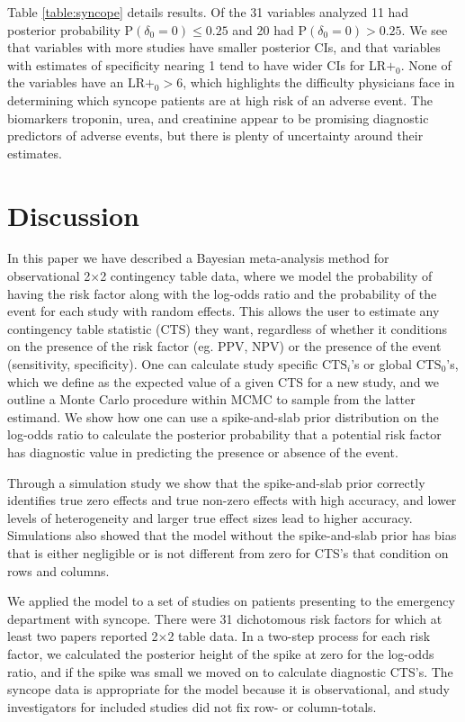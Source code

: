\documentclass[AMA,STIX1COL]{WileyNJD-v2}
\begin{document}
Table \ref{table:syncope} details results. Of the 31 variables analyzed 11 had posterior probability $\mbox{P}(\delta_0 = 0) \le 0.25$ and 20 had $\mbox{P}(\delta_0 = 0) > 0.25$. We see that variables with more studies have smaller posterior CIs, and that variables with estimates of specificity nearing 1 tend to have wider CIs for LR$+_0$. None of the variables have an $\mbox{LR}+_0 > 6$, which highlights the difficulty physicians face in determining which syncope patients are at high risk of an adverse event. The biomarkers troponin, urea, and creatinine appear to be promising diagnostic predictors of adverse events, but there is plenty of uncertainty around their estimates. 

\section{Discussion}

In this paper we have described a Bayesian meta-analysis method for observational 2$\times$2 contingency table data, where we model the probability of having the risk factor along with the log-odds ratio and the probability of the event for each study with random effects. This allows the user to estimate any contingency table statistic (CTS) they want, regardless of whether it conditions on the presence of the risk factor (eg. PPV, NPV) or the presence of the event (sensitivity, specificity). One can calculate study specific $\mbox{CTS}_i$'s or global $\mbox{CTS}_0$'s, which we define as the expected value of a given CTS for a new study, and we outline a Monte Carlo procedure within MCMC to sample from the latter estimand. We show how one can use a spike-and-slab prior distribution on the log-odds ratio to calculate the posterior probability that a potential risk factor has diagnostic value in predicting the presence or absence of the event.

Through a simulation study we show that the spike-and-slab prior correctly identifies true zero effects and true non-zero effects with high accuracy, and lower levels of heterogeneity and larger true effect sizes lead to higher accuracy. Simulations also showed that the model without the spike-and-slab prior has bias that is either negligible or is not different from zero for CTS's that condition on rows and columns. 

We applied the model to a set of studies on patients presenting to the emergency department with syncope. There were 31 dichotomous risk factors for which at least two papers reported 2$\times$2 table data. In a two-step process for each risk factor, we calculated the posterior height of the spike at zero for the log-odds ratio, and if the spike was small we moved on to calculate diagnostic CTS's. The syncope data is appropriate for the model because it is observational, and study investigators for included studies did not fix row- or column-totals. 
\end{document}
